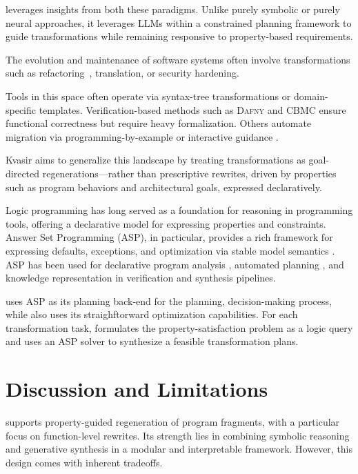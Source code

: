 \documentclass[a4paper,twoside,12pt]{report} %
\begin{document}
\sys leverages insights from both these paradigms.
Unlike purely symbolic or purely neural approaches, it leverages LLMs within a
constrained planning framework to guide transformations while remaining
responsive to property-based requirements.

The evolution and maintenance of software systems often involve transformations
such as refactoring~\cite{Fowler99,Mens04,Myers16}, translation, or security hardening. %

Tools in this space often operate via syntax-tree transformations or
domain-specific templates. Verification-based methods such as \textsc{Dafny}
\cite{leino2016dafny} and \textsc{CBMC} \cite{Clarke04} ensure functional correctness
but require heavy formalization.
Others automate migration via
programming-by-example or interactive guidance \cite{gulwani2017program, le2017interactive}.


Kvasir aims to generalize this landscape by treating transformations as
goal-directed regenerations---rather than prescriptive rewrites, driven by
properties such as program behaviors and architectural goals, expressed declaratively.

Logic programming has long served as a foundation for reasoning in programming
tools, offering a declarative model for expressing properties and constraints.
Answer Set Programming (ASP), in particular, provides a rich framework for
expressing defaults, exceptions, and optimization via stable model semantics
\cite{Gelfond_2000, Gelfond_2002, Eiter_2009}. 
ASP has been used for
declarative program analysis \cite{benton2007interactive}, automated planning
\cite{nguyen2020explainable, son2022answersetplanningsurvey}, and knowledge
representation in verification and synthesis pipelines.

\sys uses ASP as its planning back-end for the planning, decision-making
process, while also uses its straighftorward optimization capabilities.
For each transformation task, \sys formulates the property-satisfaction problem as a logic query and uses an ASP solver to
synthesize a feasible transformation plans.

\chapter{Discussion and Limitations}
\label{sec:discussion}

\sys supports property-guided regeneration of program fragments, with a particular focus on function-level rewrites. Its strength lies in combining symbolic reasoning and generative synthesis in a modular and interpretable framework. However, this design comes with inherent tradeoffs.
\end{document}
